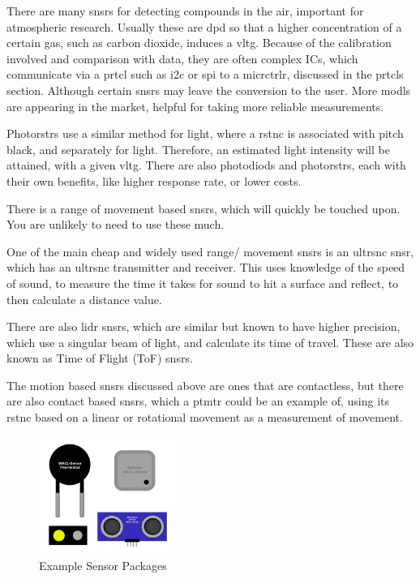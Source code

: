 \documentclass[a4paper,11pt]{report}
\begin{document}
There are many \gls{snsr}s for detecting compounds in the air, important for atmospheric research. Usually these are \gls{dpd} so that a higher concentration of a certain gas, such as carbon dioxide, induces a \gls{vltg}. Because of the calibration involved and comparison with data, they are often complex ICs, which communicate via a \gls{prtcl} such as \gls{i2c} or \gls{spi} to a \gls{micrctrlr}, discussed in the \gls{prtcl}s section. Although certain \gls{snsr}s may leave the conversion to the user. More \gls{modl}s are appearing in the market, helpful for taking more reliable measurements.


Photo\gls{rstr}s use a similar method for light, where a \gls{rstnc} is associated with pitch black, and separately for light. Therefore, an estimated light intensity will be attained, with a given \gls{vltg}. There are also photo\gls{diod}s and photo\gls{rstr}s, each with their own benefits, like higher response rate, or lower costs.


There is a range of movement based \gls{snsr}s, which will quickly be touched upon. You are unlikely to need to use these much.

One of the main cheap and widely used range/ movement \gls{snsr}s is an \gls{ultrsnc} \gls{snsr}, which has an \gls{ultrsnc} transmitter and receiver. This uses knowledge of the speed of sound, to measure the time it takes for sound to hit a surface and reflect, to then calculate a distance value.

There are also \gls{lidr} \gls{snsr}s, which are similar but known to have higher precision, which use a singular beam of light, and calculate its time of travel. These are also known as Time of Flight (ToF) \gls{snsr}s.

The motion based \gls{snsr}s discussed above are ones that are contactless, but there are also contact based \gls{snsr}s, which a \gls{ptmtr} could be an example of, using its \gls{rstnc} based on a linear or rotational movement as a measurement of movement.

\begin{figure}[H]
\centering
\includegraphics[width=0.4\textwidth]{SensorPackages}
\caption{Example Sensor Packages}
\end{figure}
\end{document}
